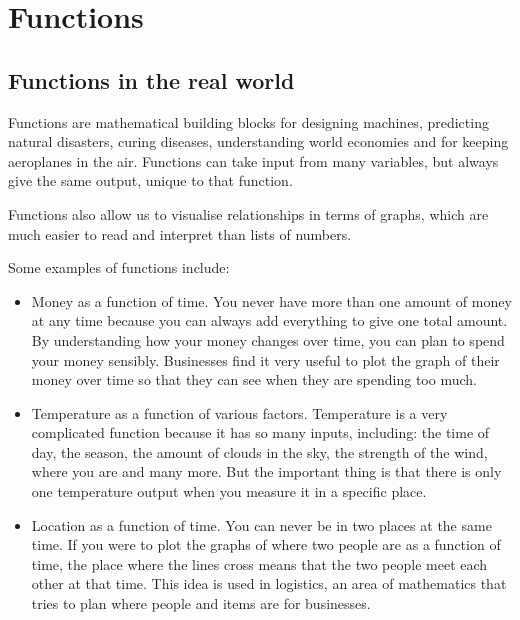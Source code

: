 
\chapter{Functions}
\setcounter{figure}{0}
\setcounter{subfigure}{0}

\section{Functions in the real world}
Functions are mathematical building blocks for designing machines, predicting natural disasters, curing diseases, understanding world economies and for keeping aeroplanes in the air. Functions can take input from many variables, but always give the same output, unique to that function. 
\par 
Functions also allow us to visualise relationships in terms of graphs, which are much easier to read and interpret than lists of numbers. 
\par
Some examples of functions include:

\begin{itemize}[itemsep=3pt]
\item Money as a function of time. You never have more than one amount of money at any time because you can always add everything to give one total amount. By understanding how your money changes over time, you can plan to spend your money sensibly. Businesses find it very useful to plot the graph of their money over time so that they can see when they are spending too much. %
\item Temperature as a function of various factors. Temperature is a very complicated function because it has so many inputs, including: the time of day, the season, the amount of clouds in the sky, the strength of the wind, where you are and many more. But the important thing is that there is only one temperature output when you measure it in a specific place. %
\item Location as a function of time. You can never be in two places at the same time. If you were to plot the graphs of where two people are as a function of time, the place where the lines cross means that the two people meet each other at that time. This idea is used in logistics, an area of mathematics that tries to plan where people and items are for businesses.
\end{itemize}

